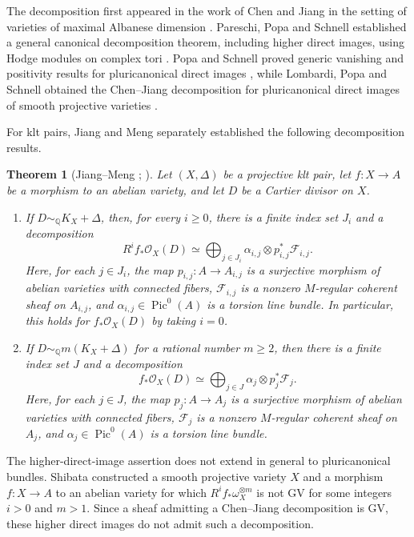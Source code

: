 \documentclass[11pt,letterpaper]{article}
\theoremstyle{paper}
\newtheorem{theorem}{Theorem}[section]
\newcommand{\OO}{\mathcal O}
\newcommand{\FF}{\mathcal F}
\newcommand{\QQ}{\mathbb Q}
\newcommand{\simQ}{\sim_{\QQ}}
\DeclareMathOperator{\Pic}{Pic}
\begin{document}
The decomposition first appeared in the work of Chen and Jiang in the setting of varieties of maximal Albanese dimension \cite[Theorem 1.1]{CJ}. Pareschi, Popa and Schnell established a general canonical decomposition theorem, including higher direct images, using Hodge modules on complex tori \cite{PPS}. Popa and Schnell proved generic vanishing and positivity results for pluricanonical direct images \cite{PS}, while Lombardi, Popa and Schnell obtained the Chen--Jiang decomposition for pluricanonical direct images of smooth projective varieties \cite{LPS}.

For klt pairs, Jiang and Meng separately established the following decomposition results.

\begin{theorem}[Jiang--Meng {\cite[Theorem 1.3]{Jiang}; \cite[Theorem 1.3 and Proposition 3.1]{Meng}}]
Let $(X,\Delta)$ be a projective klt pair, let $f:X\to A$ be a morphism to an abelian variety, and let $D$ be a Cartier divisor on $X$.
\begin{enumerate}[label=(\roman*),leftmargin=2em]
\item If $D\simQ K_X+\Delta$, then, for every $i\ge0$, there is a finite index set $J_i$ and a decomposition
\[
R^if_*\OO_X(D)\simeq\bigoplus_{j\in J_i}\alpha_{i,j}\otimes p_{i,j}^*\FF_{i,j}.
\]
Here, for each $j\in J_i$, the map $p_{i,j}:A\to A_{i,j}$ is a surjective morphism of abelian varieties with connected fibers, $\FF_{i,j}$ is a nonzero $M$-regular coherent sheaf on $A_{i,j}$, and $\alpha_{i,j}\in\Pic^0(A)$ is a torsion line bundle. In particular, this holds for $f_*\OO_X(D)$ by taking $i=0$.
\item If $D\simQ m(K_X+\Delta)$ for a rational number $m\ge2$, then there is a finite index set $J$ and a decomposition
\[
f_*\OO_X(D)\simeq\bigoplus_{j\in J}\alpha_j\otimes p_j^*\FF_j.
\]
Here, for each $j\in J$, the map $p_j:A\to A_j$ is a surjective morphism of abelian varieties with connected fibers, $\FF_j$ is a nonzero $M$-regular coherent sheaf on $A_j$, and $\alpha_j\in\Pic^0(A)$ is a torsion line bundle.
\end{enumerate}
\end{theorem}

The higher-direct-image assertion does not extend in general to pluricanonical bundles. Shibata \cite[Example 4.5]{Shibata} constructed a smooth projective variety $X$ and a morphism $f:X\to A$ to an abelian variety for which $R^if_*\omega_X^{\otimes m}$ is not GV for some integers $i>0$ and $m>1$. Since a sheaf admitting a Chen--Jiang decomposition is GV, these higher direct images do not admit such a decomposition.
\end{document}
